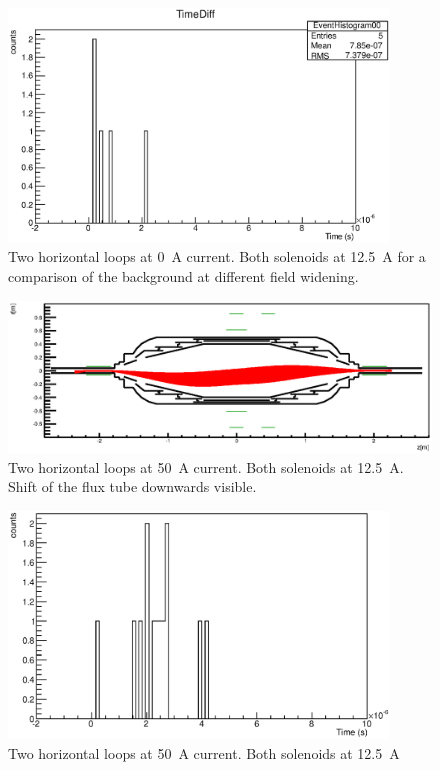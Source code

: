 \begin{figure}
\centering
	\includegraphics[width = 0.9\textwidth]{graphics/analysis/monSpec/NI.eps}
	\caption[\SI{0}{\ampere} loops analysis]{Two horizontal loops at \SI{0}{\ampere} current. Both solenoids at \SI{12.5}{\ampere} for a comparison of the background at different field widening.}
	\label{fig:NI}
\end{figure}
\clearpage



\begin{figure}
\centering
	\centerline{\includegraphics[width = 1.3\linewidth]{graphics/analysis/monSpec/fieldSimulation/NB.eps} }
	
	\caption[\SI{50}{\ampere} loops]{Two horizontal loops at \SI{50}{\ampere} current. Both solenoids at \SI{12.5}{\ampere}. Shift of the flux tube downwards visible.}
	\label{fig:NBf}
\end{figure}

\begin{figure}
\centering
	\includegraphics[width = 0.9\textwidth]{graphics/analysis/monSpec/NB.eps}
	\caption[\SI{50}{\ampere} loops analysis]{Two horizontal loops at \SI{50}{\ampere} current. Both solenoids at \SI{12.5}{\ampere} }
	\label{fig:NB}
\end{figure}
\clearpage





